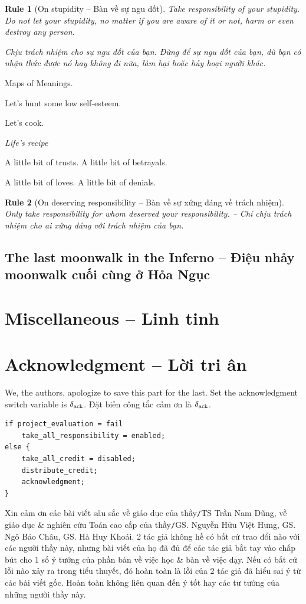 \documentclass[12pt]{article}
\newtheorem{Rule}{Rule}
\begin{document}
\begin{Rule}[On stupidity -- Bàn về sự ngu dốt]
	Take responsibility of your stupidity. Do not let your stupidity, no matter if you are aware of it or not, harm or even destroy any person.
	
	Chịu trách nhiệm cho sự ngu dốt của bạn. Đừng để sự ngu dốt của bạn, dù bạn có nhận thức được nó hay không đi nữa, làm hại hoặc hủy hoại người khác.
\end{Rule}


Maps of Meanings.

Let's hunt some low self-esteem.

Let's cook.

\begin{center}\it
	{\sc Life's recipe}
	
	A little bit of trusts. A little bit of betrayals.
	
	A little bit of loves. A little bit of denials.
\end{center}


\begin{Rule}[On deserving responsibility -- Bàn về sự xứng đáng về trách nhiệm] 
	Only take responsibility for whom deserved your responsibility. -- Chỉ chịu trách nhiệm cho ai xứng đáng với trách nhiệm của bạn.
\end{Rule}

\subsection{The last moonwalk in the Inferno -- Điệu nhảy moonwalk cuối cùng ở Hỏa Ngục}

\section{Miscellaneous -- Linh tinh}

\section{Acknowledgment -- Lời tri ân}
We, the authors, apologize to save this part for the last. Set the acknowledgment switch variable is $\delta_{\rm ack}$. Đặt biến công tắc cảm ơn là $\delta_{\rm ack}$.

\begin{verbatim}
if project_evaluation = fail
    take_all_responsibility = enabled;
else {
    take_all_credit = disabled;
    distribute_credit;
    acknowledgment;
}
\end{verbatim}
Xin cảm ơn các bài viết sâu sắc về giáo dục của thầy{\tt/}TS {\sc Trần Nam Dũng}, về giáo dục \& nghiên cứu Toán cao cấp của thầy{\tt/}GS. {\sc Nguyễn Hữu Việt Hưng}, GS. {\sc Ngô Bảo Châu}, GS. {\sc Hà Huy Khoái}. 2 tác giả không hề có bất cứ trao đổi nào với các người thầy này, nhưng bài viết của họ đã đủ để các tác giả bắt tay vào chấp bút cho 1 số ý tưởng của phần bàn về việc học \& bàn về việc dạy. Nếu có bất cứ lỗi nào xảy ra trong tiểu thuyết, đó hoàn toàn là lỗi của 2 tác giả đã hiểu sai ý từ các bài viết gốc. Hoàn toàn không liên quan đến ý tốt hay các tư tưởng của những người thầy này.
\end{document}
